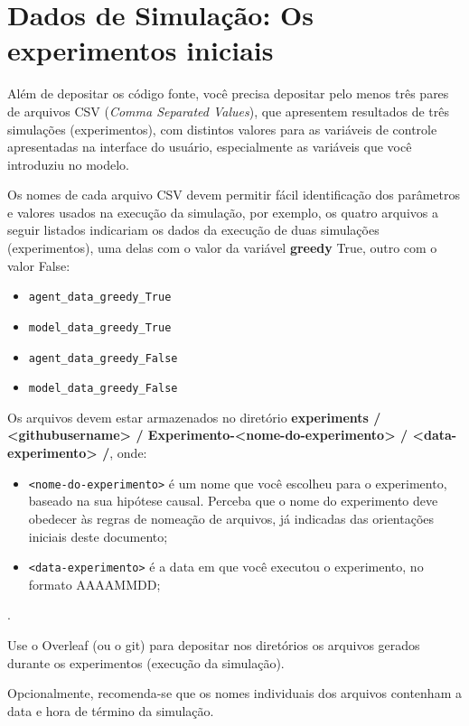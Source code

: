\section{Dados de Simulação: Os experimentos iniciais}

Além de depositar os código fonte, você precisa depositar pelo menos três pares de arquivos CSV (\textit{Comma Separated Values}), que apresentem resultados de três simulações (experimentos), com distintos valores para as variáveis de controle apresentadas na interface do usuário, especialmente as variáveis que você introduziu no modelo.

Os nomes de cada arquivo CSV devem permitir fácil identificação dos  parâmetros e valores usados na execução da simulação, por exemplo, os quatro arquivos a seguir listados indicariam os dados da execução de duas simulações (experimentos), uma delas com o valor da variável \textbf{greedy} True, outro com o valor False:
\begin{itemize}
    \item \verb|agent_data_greedy_True|
    \item \verb|model_data_greedy_True|
    \item \verb|agent_data_greedy_False|
    \item \verb|model_data_greedy_False|
\end{itemize}

Os arquivos devem estar armazenados no diretório 
\textbf{experiments / <githubusername>
/ Experimento-<nome-do-experimento> / <data-experimento> /}, onde:
\begin{itemize}
    \item \verb|<nome-do-experimento>| é um nome que você escolheu para o experimento, baseado na sua hipótese causal. Perceba que o nome do experimento deve obedecer às regras de nomeação de arquivos, já indicadas das orientações iniciais deste documento;
    \item \verb|<data-experimento>| é a data em que você executou o experimento, no formato AAAAMMDD;
\end{itemize}.

Use o Overleaf (ou o git) para depositar nos diretórios os arquivos gerados durante os experimentos (execução da simulação). 

Opcionalmente, recomenda-se que os nomes individuais dos arquivos contenham a data e hora de término da simulação.